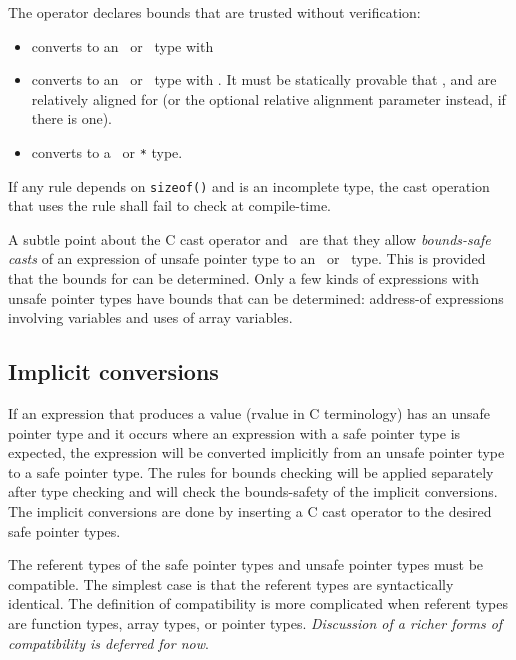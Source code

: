 The operator  declares bounds that are trusted
without verification:
\begin{itemize}
\item
  converts  to an \arrayptr\ or
  \arrayview\ type with 
\item
  converts  to an
  \arrayptr\ or \arrayview\ type with .
  It must be statically provable that ,  and 
  are relatively aligned for  (or the optional
  relative alignment parameter instead, if there is one).
\item
  converts  to a \ptr\ or \texttt{*} type.
\end{itemize}

If any rule depends on \texttt{sizeof()} and  is
an incomplete type, the cast operation that uses the rule shall fail
to check at compile-time.

A subtle point about the C cast operator and \dynamicboundscast\
are that they allow {\em bounds-safe casts} of an expression
 of unsafe pointer type to an \arrayview\ or
\arrayptr\ type. This is provided that the bounds for 
can be determined. Only a few kinds of expressions with unsafe pointer
types have bounds that can be determined: address-of expressions
involving variables and uses of array variables.

\subsection{Implicit conversions}
\label{section:implicit-conversions}

If an expression that produces a value (rvalue in C terminology)
has an unsafe pointer type and it occurs where an expression with
a safe pointer type is expected, the expression will be converted implicitly 
from an unsafe pointer type to a safe pointer type.  The rules for bounds checking will
be applied separately after type  checking and will check
the bounds-safety of the implicit conversions.  The implicit conversions are
done by inserting a C cast operator to the desired safe pointer types. 

The referent types of the safe pointer types and unsafe pointer types
must be compatible.  The simplest case is that the referent types are
syntactically identical.  The definition of compatibility is more
complicated when referent types are function types, array types, or
pointer types. {\em Discussion of a richer forms of compatibility
is deferred for now}.

